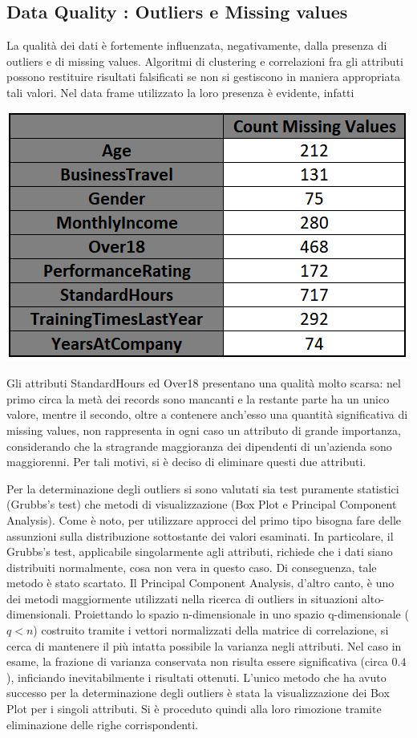 \documentclass[english]{article}
\begin{document}
\subsection{Data Quality : Outliers e Missing values}
La qualità dei dati è fortemente influenzata, negativamente, dalla presenza di outliers e di missing values. Algoritmi di clustering e correlazioni fra gli attributi possono restituire risultati falsificati se non si gestiscono in maniera appropriata tali valori. 
Nel data frame utilizzato la loro presenza è evidente, infatti

\begin{center}
\includegraphics[scale=1.5]{missingvalues.png}
\end{center}
Gli attributi StandardHours ed Over18 presentano una qualità molto scarsa: nel primo circa la metà dei records sono mancanti e la restante parte ha un unico valore, mentre il secondo, oltre a contenere anch'esso una quantità significativa di missing values, non rappresenta in ogni caso un attributo di grande importanza, considerando che la stragrande maggioranza dei dipendenti di un'azienda sono maggiorenni. Per tali motivi, si è deciso di eliminare questi due attributi.

Per la determinazione degli outliers si sono valutati sia test puramente statistici (Grubbs's test) che metodi di visualizzazione (Box Plot e Principal Component Analysis). Come è noto, per utilizzare approcci del primo tipo bisogna fare delle assunzioni sulla distribuzione sottostante dei valori esaminati. In particolare, il Grubbs's test, applicabile singolarmente agli attributi, richiede che i dati siano distribuiti normalmente, cosa non vera in questo caso. Di conseguenza, tale metodo è stato scartato. 
Il Principal Component Analysis, d'altro canto, è uno dei metodi maggiormente utilizzati nella ricerca di outliers in situazioni alto-dimensionali. Proiettando lo spazio n-dimensionale in uno spazio q-dimensionale ($q<n$) costruito tramite i vettori normalizzati della matrice di correlazione, si cerca di mantenere il più intatta possibile la varianza negli attributi. Nel caso in esame, la frazione di varianza conservata non risulta essere significativa (circa $0.4$), inficiando inevitabilmente i risultati ottenuti.
L'unico metodo che ha avuto successo per la determinazione degli outliers è stata la visualizzazione dei Box Plot per i singoli attributi. Si è proceduto quindi alla loro rimozione tramite eliminazione delle righe corrispondenti.
\end{document}
